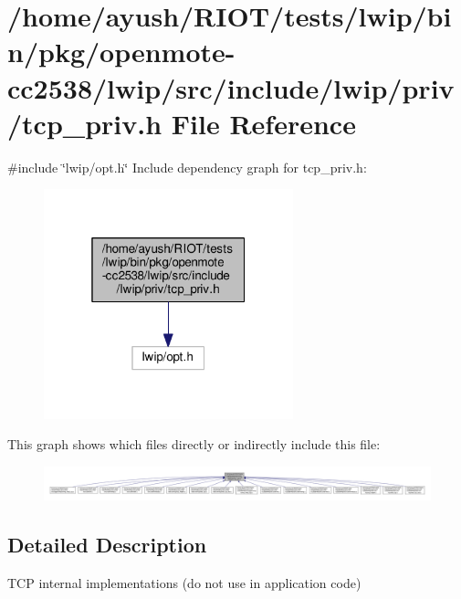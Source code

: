 \hypertarget{openmote-cc2538_2lwip_2src_2include_2lwip_2priv_2tcp__priv_8h}{}\section{/home/ayush/\+R\+I\+O\+T/tests/lwip/bin/pkg/openmote-\/cc2538/lwip/src/include/lwip/priv/tcp\+\_\+priv.h File Reference}
\label{openmote-cc2538_2lwip_2src_2include_2lwip_2priv_2tcp__priv_8h}
{\ttfamily \#include \char`\"{}lwip/opt.\+h\char`\"{}}\newline
Include dependency graph for tcp\+\_\+priv.\+h\+:
\nopagebreak
\begin{figure}[H]
\begin{center}
\leavevmode
\includegraphics[width=205pt]{openmote-cc2538_2lwip_2src_2include_2lwip_2priv_2tcp__priv_8h__incl}
\end{center}
\end{figure}
This graph shows which files directly or indirectly include this file\+:
\nopagebreak
\begin{figure}[H]
\begin{center}
\leavevmode
\includegraphics[width=350pt]{openmote-cc2538_2lwip_2src_2include_2lwip_2priv_2tcp__priv_8h__dep__incl}
\end{center}
\end{figure}


\subsection{Detailed Description}
T\+CP internal implementations (do not use in application code) 